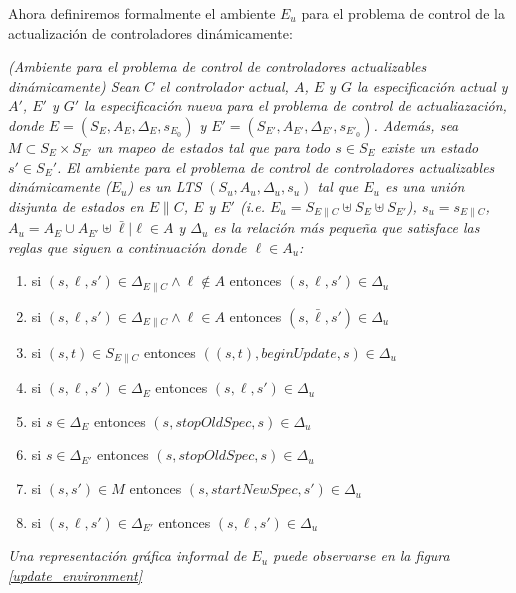 Ahora definiremos formalmente el ambiente $E_u$ para el problema de control de la actualización de controladores
dinámicamente:

\begin{nahaDef}
\emph{(Ambiente para el problema de control de controladores actualizables dinámicamente) Sean $C$ el controlador
actual, $A$, $E$ y $G$ la especificación actual y $A'$, $E'$ y $G'$ la especificación nueva para el problema de
control de actualiazación, donde $E = (S_E, A_E, \Delta_E, s_{E_0})$ y $E' = (S_{E'}, A_{E'}, \Delta_{E'}, s_{E'_0})$.
Además, sea $M \subset S_E \times S_{E'}$ un mapeo de estados tal que para todo $s \in S_E$ existe un estado $s' \in
{S_E'}$. El ambiente para el problema de control de controladores actualizables dinámicamente ($E_u$) es un LTS
$(S_u,A_u,\Delta_u,s_u)$ tal que $E_u$ es una unión disjunta de estados en $E\|C$, $E$ y $E'$ (i.e. $E_u = S_{E\|C}
\uplus S_E \uplus S_{E'}$), $s_u = s_{E\|C}$, $A_u = A_E \cup A_{E'} \uplus \bar{\ell}|\ell \in A$ y $\Delta_u$ es la relación más
pequeña que satisface las reglas que siguen a continuación donde $\ell \in A_u$:}

\begin{enumerate}
\label{update_environment_def}
\itemsep-4mm
\renewcommand*\labelenumi{[\theenumi]}
\item si $(s,\ell,s') \in \Delta_{E\|C} \wedge \ell \notin A$ entonces $(s,\ell,s') \in \Delta_u$
\item si $(s,\ell,s') \in \Delta_{E\|C} \wedge \ell \in A$ entonces $(s,\bar{\ell},s') \in \Delta_u$
\item si $(s,t) \in S_{E\|C}$ entonces $((s,t), beginUpdate,s) \in \Delta_u$
\item si $(s,\ell,s') \in \Delta_E$ entonces $(s,\ell,s') \in \Delta_u$
\item si $s \in \Delta_E$ entonces $(s,stopOldSpec,s) \in \Delta_u$
\item si $s \in \Delta_{E'}$ entonces $(s,stopOldSpec,s) \in \Delta_u$
\item si $(s,s') \in M$ entonces $(s,startNewSpec,s') \in \Delta_u$
\item si $(s,\ell,s') \in \Delta_{E'}$ entonces $(s,\ell,s') \in \Delta_u$
\end{enumerate}
\emph{Una representación gráfica informal de $E_u$ puede observarse en la figura \ref{update_environment}}
\end{nahaDef}

